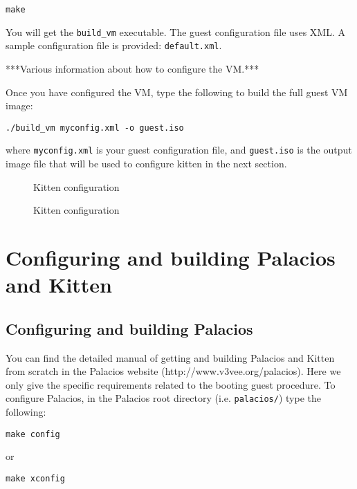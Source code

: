 \documentclass{article}[11pt]
\def\colfigsize{\epsfxsize=5in}
\begin{document}
\begin{verbatim}
make
\end{verbatim}

\vspace{10pt}
\noindent
You will get the \verb|build_vm| executable. The guest configuration file uses
XML. A sample configuration file is provided: \verb|default.xml|.

\vspace{5pt}
\noindent
***Various information about how to configure the VM.***

\vspace{5pt}
\noindent
Once you have configured the VM, type the following to build the full guest VM
image:
\begin{verbatim}
./build_vm myconfig.xml -o guest.iso
\end{verbatim}
where \verb+myconfig.xml+ is your guest configuration file, and \verb+guest.iso+
is the output image file that will be used to configure kitten in the next
section.




\pagebreak
\begin{figure}[h]\begin{center}\colfigsize{}\end{center}\caption{Kitten configuration}\label{fig:kittencf}\end{figure}




\pagebreak
\begin{figure}[h]\begin{center}\colfigsize{}\end{center}\caption{Kitten configuration}\label{fig:kittencf2}\end{figure}




\section{Configuring and building Palacios and Kitten}
\subsection*{Configuring and building Palacios}

You can find the detailed manual of getting and building Palacios and Kitten 
from scratch in the Palacios website (http://www.v3vee.org/palacios). Here we
only give the specific requirements related to the booting guest procedure. To
configure Palacios, in the Palacios root directory (i.e. \verb+palacios/+) type
the following:
\begin{verbatim}
make config
\end{verbatim}
or
\begin{verbatim}
make xconfig
\end{verbatim}
\end{document}

